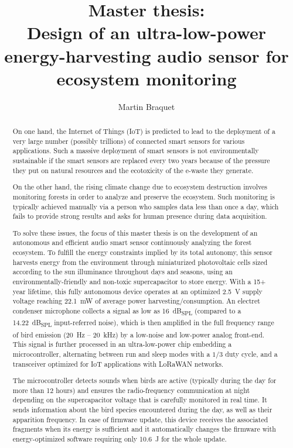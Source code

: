 \documentclass[a4paper,11pt]{article}
\title{Master thesis:\\Design of an ultra-low-power energy-harvesting audio sensor for ecosystem monitoring}
\author{Martin Braquet}
\begin{document}
\maketitle

\begin{abstract}

On one hand, the Internet of Things (IoT) is predicted to lead to the deployment of a very large number (possibly trillions) of connected smart sensors for various applications. Such a massive deployment of smart sensors is not environmentally sustainable if the smart sensors are replaced every two years because of the pressure they put on natural resources and the ecotoxicity of the e-waste they generate.

On the other hand, the rising climate change due to ecosystem destruction involves monitoring forests in order to analyze and preserve the ecosystem. Such monitoring is typically achieved manually via a person who samples data less than once a day, which fails to provide strong results and asks for human presence during data acquisition.

To solve these issues, the focus of this master thesis is on the development of an autonomous and efficient audio smart sensor continuously analyzing the forest ecosystem. To fulfill the energy constraints implied by its total autonomy, this sensor harvests energy from the environment through miniaturized photovoltaic cells sized according to the sun illuminance throughout days and seasons, using an environmentally-friendly and non-toxic supercapacitor to store energy.
With a 15+ year lifetime, this fully autonomous device operates at an optimized \SI{2.5}{V} supply voltage reaching \SI{22.1}{mW} of average power harvesting/consumption. An electret condenser microphone collects a signal as low as \SI{16}{dB_{SPL}} (compared to a \SI{14.22}{dB_{SPL}} input-referred noise), which is then amplified in the full frequency range of bird emission (\SI{20}{Hz} -- \SI{20}{kHz}) by a low-noise and low-power analog front-end. This signal is further processed in an ultra-low-power chip embedding a microcontroller, alternating between run and sleep modes with a $1/3$ duty cycle, and a transceiver optimized for IoT applications with LoRaWAN networks. 

The microcontroller detects sounds when birds are active (typically during the day for more than 12 hours) and ensures the radio-frequency communication at night depending on the supercapacitor voltage that is carefully monitored in real time. It sends information about the bird species encountered during the day, as well as their apparition frequency. In case of firmware update, this device receives the associated fragments when its energy is sufficient and it automatically changes the firmware with energy-optimized software requiring only \SI{10.6}{J} for the whole update.


\end{abstract}
\end{document}
